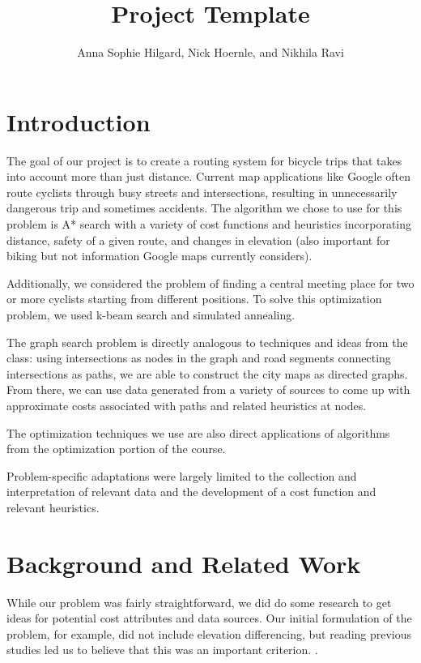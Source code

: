 \documentclass[11pt]{article}
\title{Project Template}
\author{Anna Sophie Hilgard, Nick Hoernle, and Nikhila Ravi}
\begin{document}
\maketitle{}


\section{Introduction}

The goal of our project is to create a routing system for bicycle trips that takes into account more than just distance. Current map applications like Google often route cyclists through busy streets and intersections, resulting in unnecessarily dangerous trip and sometimes accidents. The algorithm we chose to use for this problem is A* search with a variety of cost functions and heuristics incorporating distance, safety of a given route, and changes in elevation (also important for biking but not information Google maps currently considers).

Additionally, we considered the problem of finding a central meeting place for two or more cyclists starting from different positions. To solve this optimization problem, we used k-beam search and simulated annealing.

The graph search problem is directly analogous to techniques and ideas from the class: using intersections as nodes in the graph and road segments connecting intersections as paths, we are able to construct the city maps as directed graphs. From there, we can use data generated from a variety of sources to come up with approximate costs associated with paths and related heuristics at nodes.

The optimization techniques we use are also direct applications of algorithms from the optimization portion of the course.

Problem-specific adaptations were largely limited to the collection and interpretation of relevant data and the development of a cost function and relevant heuristics.

\section{Background and Related Work}

While our problem was fairly straightforward, we did do some research to get ideas for potential cost attributes and data sources. Our initial formulation of the problem, for example, did not include elevation differencing, but reading previous studies led us to believe that this was an important criterion. \cite{pmbr}.
\end{document}
